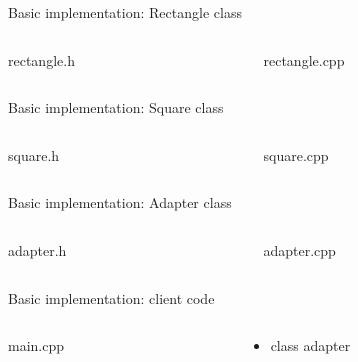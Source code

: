 \documentclass[13pt]{beamer}
\begin{document}
\begin{frame}{Basic implementation: Rectangle class}
\begin{columns}[T]
\begin{column}{.45\textwidth}
\lstset{basicstyle=\tiny,style=myCustomCppStyle}
rectangle.h

\end{column}

\begin{column}{.45\textwidth}
\lstset{basicstyle=\tiny,style=myCustomCppStyle}
rectangle.cpp

\end{column}
\end{columns}
\end{frame}

\begin{frame}{Basic implementation: Square class}
\begin{columns}[T]
\begin{column}{.45\textwidth}
\lstset{basicstyle=\tiny,style=myCustomCppStyle}
square.h

\end{column}

\begin{column}{.45\textwidth}
\lstset{basicstyle=\tiny,style=myCustomCppStyle}
square.cpp

\end{column}
\end{columns}
\end{frame}

\begin{frame}{Basic implementation: Adapter class}
\begin{columns}[T]
\begin{column}{.45\textwidth}
\lstset{basicstyle=\tiny,style=myCustomCppStyle}
adapter.h

\end{column}

\begin{column}{.45\textwidth}
\lstset{basicstyle=\tiny,style=myCustomCppStyle}
adapter.cpp

\end{column}
\end{columns}
\end{frame}

\begin{frame}{Basic implementation: client code}
\begin{columns}[T]
\begin{column}{.45\textwidth}
\lstset{basicstyle=\tiny,style=myCustomCppStyle}
main.cpp

\end{column}

\begin{column}{.45\textwidth}
\lstset{basicstyle=\tiny,style=myCustomCppStyle}
\begin{itemize}
\item class adapter
\end{itemize}
\end{column}
\end{columns}
\end{frame}
\end{document}
